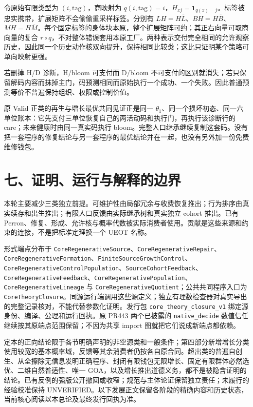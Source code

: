 \documentclass[
  11pt,
  oneside]{book}
\begin{document}
令原始有限类型为 \((i,\mathrm{tag})\)，商映射为 \(q(i,\mathrm{tag})=i\)，\(H_{xj}=\mathbf1_{q(x)=j}\)。标签被忠实携带，扩展矩阵不会偷偷重采样标签。分别有 \(L H=H\bar L\)、\(B H=H\bar B\)、\(M H=H\bar M\)。每个固定标签的身体块本原，整个扩展矩阵可约；其正右向量可取商向量的复合 \(r\circ q\)，不对整体错误套用本原工厂。两种表示交付完全相同的允许观察历史，因此同一个历史动作核双向提升，保持相同比较类；这比只证明某个策略可单向映射更强。

若删掉 H/D 诊断，H/bloom 可支付而 D/bloom 不可支付的区别就消失；若只保留解码内容而抹掉主门，码预测相同而原始执行一个成功、一个失败。因此普通预测等价不普遍保持组织、权限或控制价值。

原 Valid 正类的再生与增长最优共同见证正是同一 \(\theta_1\)、同一个损坏初态、同一六单位账本：它先支付三单位恢复自己的两活动码和执行门，再执行该诊断行的 care；未来健康时由同一真实码执行 bloom。完整人口继承继续复制这套码。没有把一套程序的修复结论与另一套程序的最优结论并在一起，也没有另外加一份免费维修钱包。

\section{七、证明、运行与解释的边界}\label{ux4e03ux8bc1ux660eux8fd0ux884cux4e0eux89e3ux91caux7684ux8fb9ux754c}

本轮主要减少三类独立前提。可维护性由局部冗余与收费恢复推出；行为排序由真实续存和出生推出；有限人口反馈由实际继承树和真实独立 cohort 推出。已有 Perron、修复、形成、允许核与概率代数被实际消费者使用。贡献是这些来源和约束的连接，不是把标准定理换一个 UEOT 名称。

形式端点分布于 \nolinkurl{CoreRegenerativeSource}、\nolinkurl{CoreRegenerativeRepair}、\nolinkurl{CoreRegenerativeFormation}、\nolinkurl{FiniteSourceGrowthControl}、\nolinkurl{CoreRegenerativeControlPopulation}、\nolinkurl{SourceCohortFeedback}、\nolinkurl{CoreRegenerativeFeedback}、\nolinkurl{CoreRegenerativePopulation}、\nolinkurl{CoreRegenerativeLineage} 与 \nolinkurl{CoreRegenerativeQuotient}；公共共同程序入口为 \nolinkurl{CoreTheoryClosure}。同源运行端调用这些源定义；独立有理数检查器对真实导出的完整记录核对，不能代替参数化证明。发行包 \nolinkurl{core_theory_closure_v1} 绑定源身份、编译、公理和运行回执。原 PR443 两个已披露的 \nolinkurl{native_decide} 数值信任继续按其原端点范围保留；不因为共享 import 图就把它们说成新端点都依赖。

定本的正向结论限于各节明确声明的非空源类和一般条件；第四部分新增增长分类使用较宽的基本概率域，反馈等其余消费者仍按各自原合同。超出类的普遍自创生、从全擦除无信息发明正确程序、封闭有限钱包无限增长、固定有限群体必然选优、二维自然普适性、唯一 GOA，以及增长推出道德义务，都不是被隐含证明的结论。已有反例的强版公开撤回或收窄；规范与主体论证保留独立责任；未履行的经验校准保持 UNVERIFIED。以下发展正文保留各阶段的精确内容和历史状态，当前核心阅读以本总论及最终发行回执为准。
\end{document}
